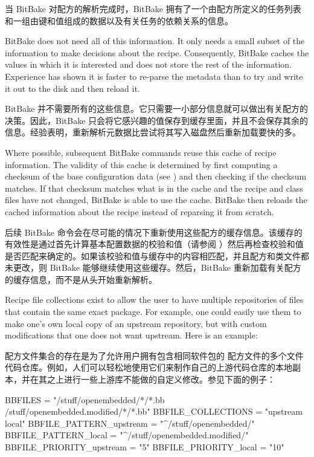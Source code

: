 当 BitBake 对配方的解析完成时，BitBake 拥有了一个由配方所定义的任务列表和一组由键和值组成的数据以及有关任务的依赖关系的信息。

BitBake does not need all of this information. It only needs a small subset of the information to make decisions about the recipe. Consequently, BitBake caches the values in which it is interested and does not store the rest of the information. Experience has shown it is faster to re-parse the metadata than to try and write it out to the disk and then reload it.

BitBake 并不需要所有的这些信息。它只需要一小部分信息就可以做出有关配方的决策。因此，BitBake 只会将它感兴趣的值保存到缓存里面，并且不会保存其余的信息。经验表明，重新解析元数据比尝试将其写入磁盘然后重新加载要快的多。

Where possible, subsequent BitBake commands reuse this cache of recipe information. The validity of this cache is determined by first computing a checksum of the base configuration data (see ) and then checking if the checksum matches. If that checksum matches what is in the cache and the recipe and class files have not changed, BitBake is able to use the cache. BitBake then reloads the cached information about the recipe instead of reparsing it from scratch.

后续 BitBake 命令会在尽可能的情况下重新使用这些配方的缓存信息。该缓存的有效性是通过首先计算基本配置数据的校验和值（请参阅 ）然后再检查校验和值是否匹配来确定的。如果该校验和值与缓存中的内容相匹配，并且配方和类文件都未更改，则 BitBake 能够继续使用这些缓存。然后，BitBake 重新加载有关配方的缓存信息，而不是从头开始重新解析。

Recipe file collections exist to allow the user to have multiple repositories of  files that contain the same exact package. For example, one could easily use them to make one's own local copy of an upstream repository, but with custom modifications that one does not want upstream. Here is an example:

配方文件集合的存在是为了允许用户拥有包含相同软件包的  配方文件的多个文件代码仓库。例如，人们可以轻松地使用它们来制作自己的上游代码仓库的本地副本，并在其之上进行一些上游库不能做的自定义修改。参见下面的例子：

\begin{pyglist}
BBFILES = "/stuff/openembedded/*/*.bb /stuff/openembedded.modified/*/*.bb"
BBFILE_COLLECTIONS = "upstream local"
BBFILE_PATTERN_upstream = "^/stuff/openembedded/"
BBFILE_PATTERN_local = "^/stuff/openembedded.modified/"
BBFILE_PRIORITY_upstream = "5"
BBFILE_PRIORITY_local = "10"
\end{pyglist}


